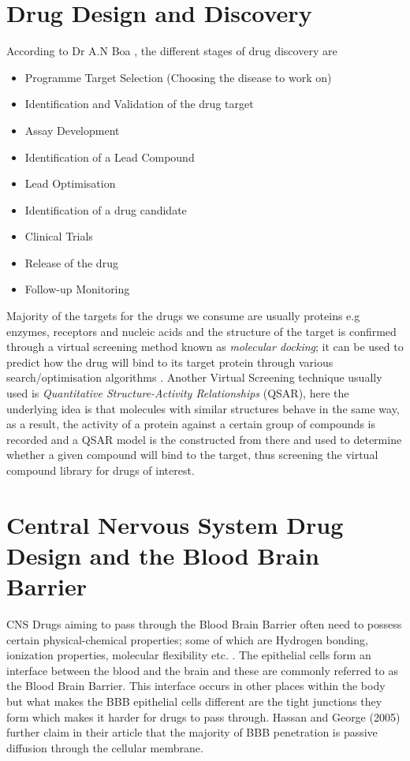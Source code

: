 \documentclass[a4paper,12pt]{report}
\begin{document}
	\section{Drug Design and Discovery}
	According to Dr A.N Boa \cite{hull2016}, the different stages of drug discovery are
		\begin{itemize}
			\item Programme Target Selection (Choosing the disease to work on)
			\item Identification and Validation of the drug target
			\item Assay Development
			\item Identification of a Lead Compound
			\item Lead Optimisation
			\item Identification of a drug candidate 
			\item Clinical Trials 
			\item Release of the drug 
			\item Follow-up Monitoring
		\end{itemize}
	Majority of the targets for the drugs we consume are usually proteins e.g enzymes, receptors and nucleic acids and the structure of the target is confirmed through a virtual screening method known as \textit{molecular docking}; it can be used to predict how the drug will bind to its target protein through various search/optimisation algorithms \cite{Jurgen2004}.
	Another Virtual Screening technique usually used is \textit{Quantitative Structure-Activity Relationships} (QSAR), here the underlying idea is that molecules with similar structures behave in the same way, as a result, the activity of a protein against a certain group of compounds is recorded and a QSAR model is the constructed from there and used to determine whether a given compound will bind to the target, thus screening the virtual compound library for drugs of interest.
	
	\section[CNS Drug Design and the Blood Brain Barrier]{Central Nervous System Drug Design and the Blood Brain Barrier}
	CNS Drugs aiming to pass through the Blood Brain Barrier often need to possess certain physical-chemical properties; some of which are Hydrogen bonding, ionization properties, molecular flexibility etc. \cite{Hassanetal2005}. The epithelial cells form an interface between the blood and the brain and these are commonly referred to as the Blood Brain Barrier. This interface occurs in other places within the body but what makes the BBB epithelial cells different are the tight junctions they form which makes it harder for drugs to pass through. Hassan and George (2005) further claim in their article that the majority of BBB penetration is passive diffusion through the cellular membrane.
\end{document}
